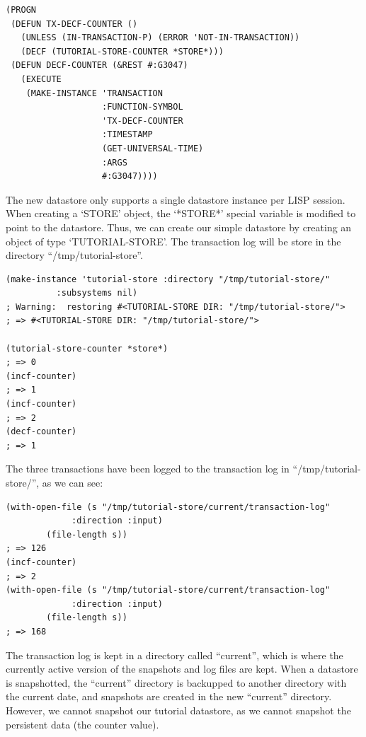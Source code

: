 \begin{Verbatim}[fontsize=\small,frame=leftline,framerule=0.9mm,rulecolor=\color{gray},framesep=5.1mm,xleftmargin=5mm,fontfamily=cmtt]
(PROGN
 (DEFUN TX-DECF-COUNTER ()
   (UNLESS (IN-TRANSACTION-P) (ERROR 'NOT-IN-TRANSACTION))
   (DECF (TUTORIAL-STORE-COUNTER *STORE*)))
 (DEFUN DECF-COUNTER (&REST #:G3047)
   (EXECUTE
    (MAKE-INSTANCE 'TRANSACTION
                   :FUNCTION-SYMBOL
                   'TX-DECF-COUNTER
                   :TIMESTAMP
                   (GET-UNIVERSAL-TIME)
                   :ARGS
                   #:G3047))))
\end{Verbatim}
The new datastore only supports a single datastore instance per
LISP session. When creating a `STORE' object, the `*STORE*'
special variable is modified to point to the datastore. Thus, we
can create our simple datastore by creating an object of type
`TUTORIAL-STORE'. The transaction log will be store in the
directory ``/tmp/tutorial-store''.

\begin{Verbatim}[fontsize=\small,frame=leftline,framerule=0.9mm,rulecolor=\color{gray},framesep=5.1mm,xleftmargin=5mm,fontfamily=cmtt]
(make-instance 'tutorial-store :directory "/tmp/tutorial-store/"
          :subsystems nil)
; Warning:  restoring #<TUTORIAL-STORE DIR: "/tmp/tutorial-store/">
; => #<TUTORIAL-STORE DIR: "/tmp/tutorial-store/">

(tutorial-store-counter *store*)
; => 0
(incf-counter)
; => 1
(incf-counter)
; => 2
(decf-counter)
; => 1
\end{Verbatim}
The three transactions have been logged to the transaction log in
``/tmp/tutorial-store/'', as we can see:

\begin{Verbatim}[fontsize=\small,frame=leftline,framerule=0.9mm,rulecolor=\color{gray},framesep=5.1mm,xleftmargin=5mm,fontfamily=cmtt]
(with-open-file (s "/tmp/tutorial-store/current/transaction-log"
             :direction :input)
        (file-length s))
; => 126
(incf-counter)
; => 2
(with-open-file (s "/tmp/tutorial-store/current/transaction-log"
             :direction :input)
        (file-length s))
; => 168
\end{Verbatim}
The transaction log is kept in a directory called ``current'', which
is where the currently active version of the snapshots and log
files are kept. When a datastore is snapshotted, the ``current''
directory is backupped to another directory with the current date,
and snapshots are created in the new ``current'' directory. However,
we cannot snapshot our tutorial datastore, as we cannot snapshot
the persistent data (the counter value). 

